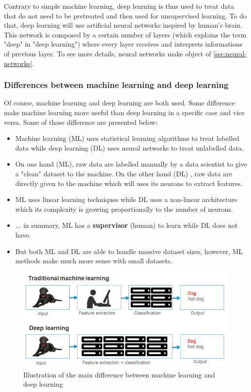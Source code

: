 \documentclass[11pt, openany]{report}
\theoremstyle{plain}
\theoremstyle{definition}
\theoremstyle{remark}
\begin{document}
Contrary to simple machine learning, deep learning is thus used to treat data that do not need to be pretreated and then used for unsupervised learning. To do that, deep learning will use artificial neural networks inspired by human's brain. This network is composed by a certain number of layers (which explains the term "deep" in "deep learning") where every layer receives and interprets informations of previous layer. To see more details, neural networks make object of \autoref{sec:neural-networks}.  

\subsubsection{Differences between machine learning and deep learning}
Of course, machine learning and deep learning are both used. Some difference make machine learning more useful than deep learning in a specific case and vice versa. Some of those difference are presented below: 
\begin{itemize}
\item Machine learning (ML) uses statistical learning algorithms to treat labelled data while deep learning (DL) uses neural networks to treat unlabelled data.
\item On one hand (ML), raw data are labelled manually by a data scientist to give a "clean" dataset to the machine. On the other hand (DL) , raw data are directly given to the machine which will uses its neurons to extract features. 
\item ML uses linear learning techniques while DL uses a non-linear architecture which its complexity is growing proportionally to the number of neurons.   
\item ... in summary, ML has a \textbf{supervisor} (human) to learn while DL does not have. 
\item But both ML and DL are able to handle massive dataset sizes, however, ML methods make much more sense with small datasets. 
\end{itemize} 
 
\begin{figure}[h]
  \centering
  \includegraphics[scale=0.65]{figures/machineVSdeep.png}
  \caption{Illustration of the main difference between machine learning and deep learning}
  \label{fig:machineVSdeep}
\end{figure}
\end{document}
